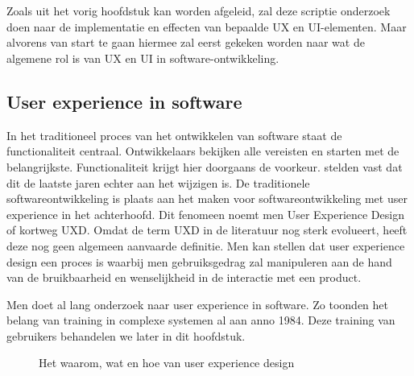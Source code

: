 \chapter{}
\label{ch:stand-van-zaken}


Zoals uit het vorig hoofdstuk kan worden afgeleid, zal deze scriptie onderzoek doen naar de implementatie en effecten van bepaalde UX en UI-elementen. Maar alvorens van start te gaan hiermee zal eerst gekeken worden naar wat de algemene rol is van UX en UI in software-ontwikkeling.

\section{User experience in software}
\label{sec:user-experience-in-software}

In het traditioneel proces van het ontwikkelen van software staat de functionaliteit centraal. Ontwikkelaars bekijken alle vereisten en starten met de belangrijkste. Functionaliteit krijgt hier doorgaans de voorkeur. \textcite{Harutyunyan2019} stelden vast dat dit de laatste jaren echter aan het wijzigen is. De traditionele softwareontwikkeling is plaats aan het maken voor softwareontwikkeling met user experience in het achterhoofd. Dit fenomeen noemt men User Experience Design of kortweg UXD. Omdat de term UXD in de literatuur nog sterk evolueert, heeft deze nog geen algemeen aanvaarde definitie. Men kan stellen dat user experience design een proces is waarbij men gebruiksgedrag zal manipuleren aan de hand van de bruikbaarheid en wenselijkheid in de interactie met een product.

Men doet al lang onderzoek naar user experience in software. Zo toonden \textcite{Carroll1984} het belang van training in complexe systemen al aan anno 1984. Deze training van gebruikers behandelen we later in dit hoofdstuk.

\begin{figure}[h]
    \centering
    \def\svgwidth{.8\columnwidth}
    
    \caption{Het waarom, wat en hoe van user experience design}
    \label{fig:ux-waarom-wat-hoe}
\end{figure}

